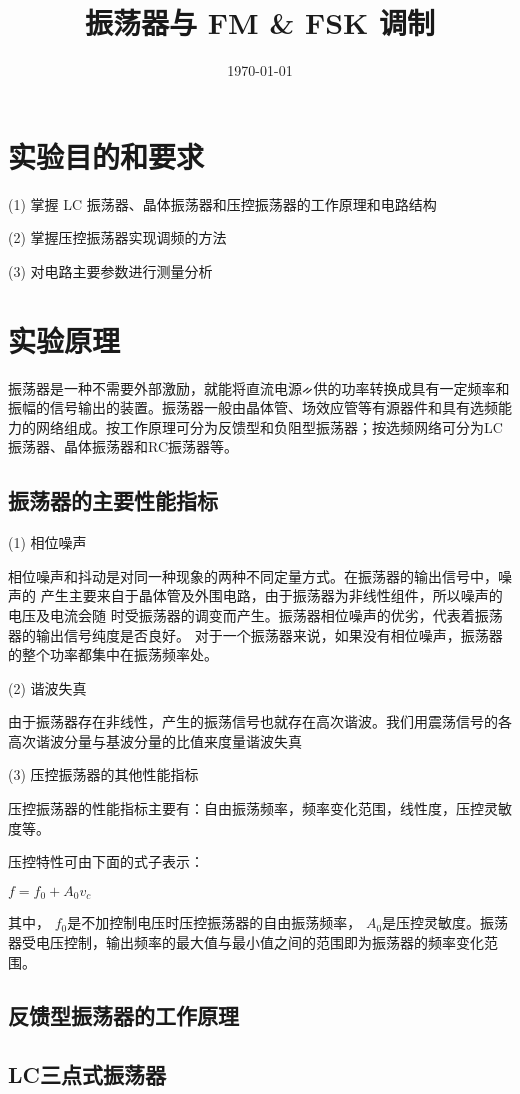 \documentclass{../source/Experiment}
\title{振荡器与 FM \& FSK 调制}
\date{\today}
\begin{document}
\section{实验目的和要求}
 (1) 掌握 LC 振荡器、晶体振荡器和压控振荡器的工作原理和电路结构

(2) 掌握压控振荡器实现调频的方法

(3) 对电路主要参数进行测量分析


\section{实验原理}
振荡器是一种不需要外部激励，就能将直流电源ᨀ供的功率转换成具有一定频率和振幅的信号输出的装置。振荡器一般由晶体管、场效应管等有源器件和具有选频能力的网络组成。按工作原理可分为反馈型和负阻型振荡器；按选频网络可分为LC振荡器、晶体振荡器和RC振荡器等。

\subsection{振荡器的主要性能指标}

(1) 相位噪声

相位噪声和抖动是对同一种现象的两种不同定量方式。在振荡器的输出信号中，噪声的
产生主要来自于晶体管及外围电路，由于振荡器为非线性组件，所以噪声的电压及电流会随
时受振荡器的调变而产生。振荡器相位噪声的优劣，代表着振荡器的输出信号纯度是否良好。
对于一个振荡器来说，如果没有相位噪声，振荡器的整个功率都集中在振荡频率处。

(2) 谐波失真

由于振荡器存在非线性，产生的振荡信号也就存在高次谐波。我们用震荡信号的各高次谐波分量与基波分量的比值来度量谐波失真

(3) 压控振荡器的其他性能指标

压控振荡器的性能指标主要有：自由振荡频率，频率变化范围，线性度，压控灵敏度等。

压控特性可由下面的式子表示：

$f = f_0 + A_0v_c$


其中， $f_0$是不加控制电压时压控振荡器的自由振荡频率， $A_0 $是压控灵敏度。振荡器受电压控制，输出频率的最大值与最小值之间的范围即为振荡器的频率变化范围。

\subsection{反馈型振荡器的工作原理}

\subsection{LC三点式振荡器}
\end{document}
